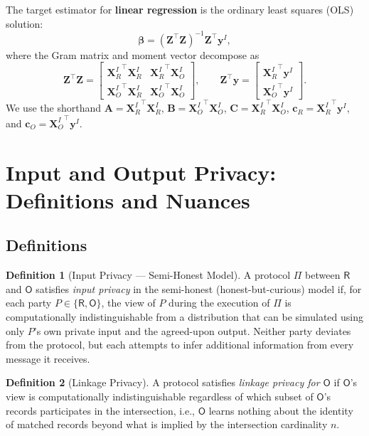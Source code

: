 \documentclass[12pt]{article}
\theoremstyle{definition}
\newtheorem{definition}{Definition}[section]
\theoremstyle{plain}
\newcommand{\bXRI}{\mathbf{X}_{R}^{I}}
\newcommand{\bXOI}{\mathbf{X}_{O}^{I}}
\newcommand{\bZ}{\mathbf{Z}}
\newcommand{\by}{\mathbf{y}}
\newcommand{\bbeta}{\boldsymbol{\beta}}
\newcommand{\bA}{\mathbf{A}}
\newcommand{\bB}{\mathbf{B}}
\newcommand{\bC}{\mathbf{C}}
\newcommand{\bcR}{\mathbf{c}_{R}}
\newcommand{\bcO}{\mathbf{c}_{O}}
\newcommand{\Party}[1]{\textsf{#1}}
\begin{document}
The target estimator for \textbf{linear regression} is the ordinary least squares (OLS) solution:
\begin{equation}
  \label{eq:ols}
  \bbeta = (\bZ^{\top}\bZ)^{-1}\bZ^{\top}\by^{I},
\end{equation}
where the Gram matrix and moment vector decompose as
\begin{equation}
  \label{eq:gram}
  \bZ^{\top}\bZ =
  \begin{bmatrix}
    {\bXRI}^{\top}\bXRI & {\bXRI}^{\top}\bXOI \\
    {\bXOI}^{\top}\bXRI & {\bXOI}^{\top}\bXOI
  \end{bmatrix}, \qquad
  \bZ^{\top}\by =
  \begin{bmatrix}
    {\bXRI}^{\top}\by^{I} \\
    {\bXOI}^{\top}\by^{I}
  \end{bmatrix}.
\end{equation}
We use the shorthand $\bA = {\bXRI}^{\top}\bXRI$, $\bB = {\bXOI}^{\top}\bXOI$, $\bC = {\bXRI}^{\top}\bXOI$, $\bcR = {\bXRI}^{\top}\by^{I}$, and $\bcO = {\bXOI}^{\top}\by^{I}$.


\section{Input and Output Privacy: Definitions and Nuances}

\subsection{Definitions}

\begin{definition}[Input Privacy --- Semi-Honest Model]
A protocol $\Pi$ between $\Party{R}$ and $\Party{O}$ satisfies \emph{input privacy} in the semi-honest (honest-but-curious) model if, for each party $P \in \{\Party{R}, \Party{O}\}$, the view of $P$ during the execution of $\Pi$ is computationally indistinguishable from a distribution that can be simulated using only $P$'s own private input and the agreed-upon output. Neither party deviates from the protocol, but each attempts to infer additional information from every message it receives.
\end{definition}

\begin{definition}[Linkage Privacy]
A protocol satisfies \emph{linkage privacy for $\Party{O}$} if $\Party{O}$'s view is computationally indistinguishable regardless of which subset of $\Party{O}$'s records participates in the intersection, i.e., $\Party{O}$ learns nothing about the identity of matched records beyond what is implied by the intersection cardinality $n$.
\end{definition}
\end{document}
